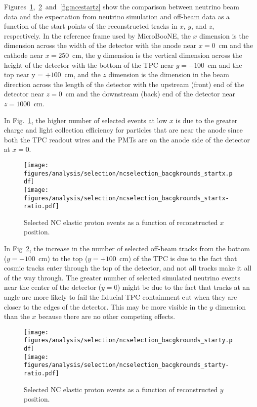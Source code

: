     Figures~\ref{fig:ncestartx},~\ref{fig:ncestarty}~and~\ref{fig:ncestartz}
    show the comparison between neutrino beam data and the expectation from
    neutrino simulation and off-beam data as a function of the start points of
    the reconstructed tracks in $x$, $y$, and $z$, respectively. In the
    reference frame used by MicroBooNE, the $x$ dimension is the dimension
    across the width of the detector with the anode near $x = 0$~cm and the
    cathode near $x = 250$~cm, the $y$ dimension is the vertical dimension
    across the height of the detector with the bottom of the TPC near $y =
    -100$~cm and the top near y = $+100$~cm, and the $z$ dimension is the
    dimension in the beam direction across the length of the detector with the
    upstream (front) end of the detector near $z = 0$~cm and the downstream
    (back) end of the detector near $z = 1000$~cm.
    
    In Fig.~\ref{fig:ncestartx}, the higher number of selected events at low
    $x$ is due to the greater charge and light collection efficiency for
    particles that are near the anode since both the TPC readout wires and the
    PMTs are on the anode side of the detector at $x = 0$.
    \begin{figure}[ht]
      \centering
      \texttt{[image: figures/analysis/selection/ncselection\_bacgkrounds\_startx.pdf]} \\
      \texttt{[image: figures/analysis/selection/ncselection\_bacgkrounds\_startx-ratio.pdf]} \\
      \caption{Selected NC elastic proton events as a function of reconstructed $x$ position.}
      \label{fig:ncestartx}
    \end{figure}

    In Fig~\ref{fig:ncestarty}, the increase in the number of selected off-beam
    tracks from the bottom ($y = -100$~cm) to the top ($y = +100$~cm) of the
    TPC is due to the fact that cosmic tracks enter through the top of the
    detector, and not all tracks make it all of the way through. The greater
    number of selected simulated neutrino events near the center of the
    detector ($y = 0$) might be due to the fact that tracks at an angle are
    more likely to fail the fiducial TPC containment cut when they are closer
    to the edges of the detector. This may be more visible in the $y$ dimension
    than the $x$ because there are no other competing effects.
    \begin{figure}[ht]
      \centering
      \texttt{[image: figures/analysis/selection/ncselection\_bacgkrounds\_starty.pdf]} \\
      \texttt{[image: figures/analysis/selection/ncselection\_bacgkrounds\_starty-ratio.pdf]} \\
      \caption{Selected NC elastic proton events as a function of reconstructed $y$ position.}
      \label{fig:ncestarty}
    \end{figure}

